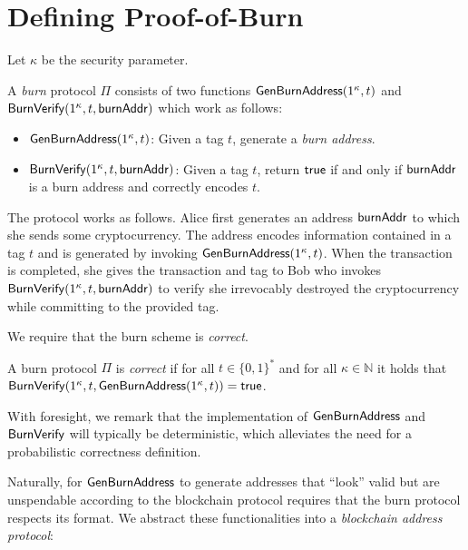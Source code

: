 \section{Defining Proof-of-Burn}

Let $\kappa$ be the security parameter.

\begin{definition}
  A \emph{burn} protocol $\Pi$ consists of two functions $\mathsf{Gen}\-\mathsf{Burn}\-\mathsf{Address}(1^\kappa, t)$ and $\mathsf{BurnVerify}(1^\kappa, t, \mathsf{burnAddr})$ which work as follows:

  \begin{itemize}
    \item $\mathsf{Gen}\-\mathsf{Burn}\-\mathsf{Address}(1^\kappa, t)$: Given a tag $t$, generate a \emph{burn address}.

    \item $\mathsf{BurnVerify}(1^\kappa, t, \mathsf{burnAddr})$: Given a tag $t$, return $\sf{true}$ if and only if $\mathsf{burnAddr}$ is a burn address and correctly encodes $t$.
  \end{itemize}
\end{definition}

The protocol works as follows. Alice first generates an address $\mathsf{burnAddr}$ to which she sends some cryptocurrency. The address encodes information contained in a tag $t$ and is generated by invoking $\mathsf{Gen}\-\mathsf{Burn}\-\mathsf{Address}(1^\kappa, t)$. When the transaction is completed, she gives the transaction and tag to Bob who invokes $\mathsf{BurnVerify}(1^\kappa, t, \mathsf{burnAddr})$ to verify she irrevocably destroyed the cryptocurrency while committing to the provided tag.

We require that the burn scheme is \emph{correct}.

\begin{definition}[Correctness]
  A burn protocol $\Pi$ is \emph{correct} if for all $t \in \{0,1\}^*$ and for all $\kappa \in \mathbb{N}$ it holds that
  $\mathsf{BurnVerify}(1^\kappa, t, \mathsf{Gen}\-\mathsf{Burn}\-\mathsf{Address}(1^\kappa, t)) = \mathsf{true}$.
\end{definition}

With foresight, we remark that the implementation of $\mathsf{Gen}\-\mathsf{Burn}\-\mathsf{Address}$ and $\mathsf{BurnVerify}$ will typically be deterministic, which alleviates the need for a probabilistic correctness definition.

Naturally, for $\mathsf{Gen}\-\mathsf{Burn}\-\mathsf{Address}$ to generate addresses that ``look'' valid but are unspendable according to the blockchain protocol requires that the burn protocol respects its format. We abstract these functionalities into a \emph{blockchain address protocol}:

